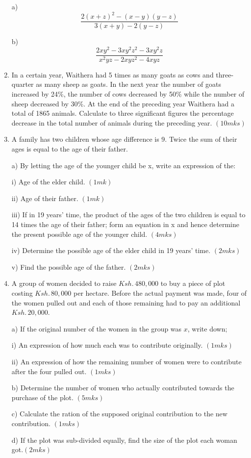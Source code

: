\documentclass[
  a4paperpaper,
]{scrbook}
\begin{document}
\begin{tcolorbox}
\begin{enumerate}
  a) \[ \frac{2(x+z)^2-(x-y)(y-z)}{3(x+y)-2(y-z)}\]

  b) \[
  \frac{2xy^2-3xy^2z^2-3xy^2z}{x^2yz-2xyz^2-4xyz}
  \]
\item
  In a certain year, Waithera had 5 times as many goats as cows and
  three-quarter as many sheep as goats. In the next year the number of
  goats increased by 24\%, the number of cows decreased by 50\% while
  the number of sheep decreased by 30\%. At the end of the preceding
  year Waithera had a total of 1865 animals. Calculate to three
  significant figures the percentage decrease in the total number of
  animals during the preceding year. \((10mks)\)
\item
  A family has two children whose age difference is 9. Twice the sum of
  their ages is equal to the age of their father.

  a) By letting the age of the younger child be x, write an expression
  of the:

  i) Age of the elder child. \((1mk)\)

  ii) Age of their father. \((1mk)\)

  iii) If in 19 years' time, the product of the ages of the two children
  is equal to 14 times the age of their father; form an equation in x
  and hence determine the present possible age of the younger child.
  \((4mks)\)

  iv) Determine the possible age of the elder child in 19 years' time.
  \((2mks)\)

  v) Find the possible age of the father. \((2mks)\)
\item
  A group of women decided to raise \(Ksh. \, 480, 000\) to buy a piece
  of plot costing \(Ksh.\, 80, 000\) per hectare. Before the actual
  payment was made, four of the women pulled out and each of those
  remaining had to pay an additional \(Ksh. \,20, 000\).

  a) If the original number of the women in the group was \(x\), write
  down;

  i) An expression of how much each was to contribute originally.
  \((1mks)\)

  ii) An expression of how the remaining number of women were to
  contribute after the four pulled out. \((1mks)\)

  b) Determine the number of women who actually contributed towards the
  purchase of the plot. \((5mks)\)

  c) Calculate the ration of the supposed original contribution to the
  new contribution. \((1mks)\)

  d) If the plot was sub-divided equally, find the size of the plot each
  woman got.\((2mks)\)
\end{enumerate}

\end{tcolorbox}
\end{document}

